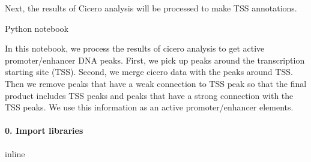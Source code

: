 \documentclass[letterpaper,10pt,english]{sphinxmanual}
\begin{document}
Next, the results of Cicero analysis will be processed to make TSS annotations.

Python notebook

In this notebook, we process the results of cicero analysis to get active promoter/enhancer DNA peaks. First, we pick up peaks around the transcription starting site (TSS). Second, we merge cicero data with the peaks around TSS. Then we remove peaks that have a weak connection to TSS peak so that the final product includes TSS peaks and peaks that have a strong connection with the TSS peaks. We use this information as an active promoter/enhancer elements.


\paragraph{0. Import libraries}
\label{\detokenize{notebooks/01_ATAC-seq_data_processing/option1_scATAC-seq_data_analysis_with_cicero/02_preprocess_peak_data:0.-Import-libraries}}\label{\detokenize{notebooks/01_ATAC-seq_data_processing/option1_scATAC-seq_data_analysis_with_cicero/02_preprocess_peak_data::doc}}
{
\begin{sphinxVerbatim}[commandchars=\\\{\}]
\llap{\color{nbsphinxin}[1]:\,\hspace{\fboxrule}\hspace{\fboxsep}}   
   
   
 inline

   


     
     

     
\end{sphinxVerbatim}
}
\end{document}

